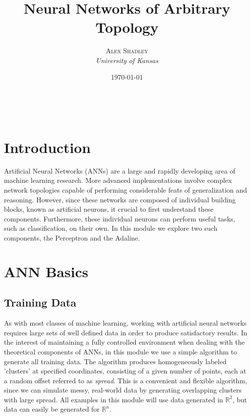 \documentclass[a4paper, 11pt]{article} %
\title{\textbf{Neural Networks of Arbitrary Topology}} %
\author{\textsc{Alex Shadley} %
\\{\textit{University of Kansas}}} %
\date{\today} %
\makeatletter
\renewcommand{\maketitle}{ %
\begin{flushright} %
{\LARGE\@title} %

\vspace{50pt} %

{\large\@author} %
\\\@date %

\vspace{40pt} %
\end{flushright}
}
\makeatother
\begin{document}
\maketitle %


\section*{Introduction}

Artificial Neural Networks (ANNs) are a large and rapidly developing area of machine learning research.  More advanced implementations involve complex network topologies capable of performing considerable feats of generalization and reasoning.  However, since these networks are composed of individual building blocks, known as artificial neurons, it crucial to first understand these components.  Furthermore, these individual neurons can perform useful tasks, such as classification, on their own.  In this module we explore two such components, the Perceptron and the Adaline.

\section*{ANN Basics}

\subsection*{Training Data}

As with most classes of machine learning, working with artificial neural networks requires large sets of well defined data in order to produce satisfactory results.  In the interest of maintaining a fully controlled environment when dealing with the theoretical components of ANNs, in this module we use a simple algorithm to generate all training data.  The algorithm produces homogeneously labeled 'clusters' at specified coordinates, consisting of a given number of points, each at a random offset referred to as \textit{spread}.  This is a convenient and flexible algorithm, since we can simulate messy, real-world data by generating overlapping clusters with large spread.  All examples in this module will use data generated in $\mathbb{R}^2$, but data can easily be generated for $\mathbb{R}^n$.
\end{document}
